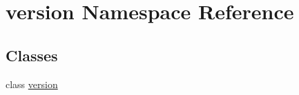 \hypertarget{namespaceversion}{
\section{version Namespace Reference}
\label{namespaceversion}
}
\subsection*{Classes}
\begin{DoxyCompactItemize}
\item 
class \hyperlink{classversion_1_1version}{version}
\end{DoxyCompactItemize}

